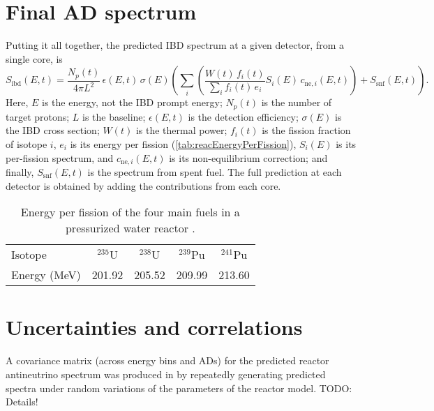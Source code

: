 \documentclass[../thesis.tex]{subfiles}
\begin{document}

\section{Final AD spectrum}
\label{sec:adspectra}

Putting it all together, the predicted IBD spectrum at a given detector, from a single core, is
\begin{equation}
  S_{\mathrm{ibd}}(E, t) = \frac{N_p(t)}{4\pi L^2} \, \epsilon(E, t) \,
    \sigma(E) \left( \sum_i \left( \frac{W(t) \, f_i(t)}{\sum_i f_i(t) \, e_i}
        S_i(E) \, c_{\mathrm{ne},i}(E, t) \right) + S_{\mathrm{snf}}(E, t)
    \right).
\end{equation}
Here, $E$ is the \nubar energy, not the IBD prompt energy; $N_p(t)$ is the number of target protons; $L$ is the baseline; $\epsilon(E, t)$ is the detection efficiency; $\sigma(E)$ is the IBD cross section; $W(t)$ is the thermal power; $f_i(t)$ is the fission fraction of isotope $i$, $e_i$ is its energy per fission (\autoref{tab:reacEnergyPerFission}), $S_i(E)$ is its per-fission spectrum, and $c_{\mathrm{ne},i}(E, t)$ is its non-equilibrium correction; and finally, $S_\mathrm{snf}(E, t)$ is the spectrum from spent fuel. The full prediction at each detector is obtained by adding the contributions from each core.

\begin{table}[ht]
  \begin{tabular}{l|cccc}
    \toprule
    Isotope & $^{235}$U & $^{238}$U & $^{239}$Pu & $^{241}$Pu \\
    Energy (MeV) & 201.92 & 205.52 & 209.99 & 213.60 \\
    \bottomrule
  \end{tabular}
  \caption{Energy per fission of the four main fuels in a pressurized water reactor \cite{Kopeikin_2004}.}
  \label{tab:reacEnergyPerFission}
\end{table}

\section{Uncertainties and correlations}
\label{sec:reacunccorr}

A covariance matrix (across energy bins and ADs) for the predicted reactor antineutrino spectrum was produced in \cite{Lewis} by repeatedly generating predicted spectra under random variations of the parameters of the reactor model. TODO: Details!
\end{document}
